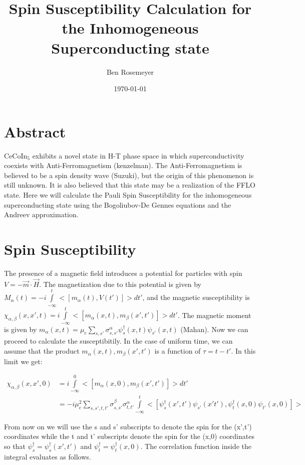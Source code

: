 \documentclass{article}
\begin{document}
\title{Spin Susceptibility Calculation for the Inhomogeneous Superconducting state}
\author{Ben Rosemeyer}
\date{\today}
\maketitle

\section*{Abstract}
CeCoIn$_5$ exhibits a novel state in H-T phase space in which superconductivity coexists with Anti-Ferromagnetism (kenzelman). The Anti-Ferromagnetism is believed to be a spin density wave (Suzuki), but the origin of this phenomenon is still unknown. It is also believed that this state may be a realization of the FFLO state. Here we will calculate the Pauli Spin Susceptibility for the inhomogeneous superconducting state using the Bogoliubov-De Gennes equations and the Andreev approximation.

\section*{Spin Susceptibility}
The presence of a magnetic field introduces a potential for particles with spin $V=-\vec{m}\cdot\vec{H}$. The magnetization due to this potential is given by $M_\alpha(t)=-i\int\limits_{-\infty}^t <[m_\alpha(t),V(t')]>dt'$, and the magnetic susceptibility is $\chi_{\alpha,\beta}(x,x',t)=i\int\limits_{-\infty}^t<[m_\alpha(x,t),m_\beta(x',t')]>dt'$. The magnetic moment is given by $m_\alpha(x,t)=\mu_e\sum\limits_{s,s'} \sigma^{\alpha}_{s,s'}\psi^\dagger_s(x,t) \psi_{s'}(x,t)$ (Mahan). Now we can proceed to calculate the susceptibitily. In the case of uniform time, we can assume that the product $m_\alpha(x,t),m_\beta(x',t')$ is a function of $\tau=t-t'$. In this limit we get:

\begin{align*}
\chi_{\alpha,\beta}(x,x',0)&=i\int\limits_{-\infty}^0<[m_\alpha(x,0),m_\beta(x',t')]>dt' \\ 
&=-i\mu_e^2\sum\limits_{s,s',t,t'}\sigma^{\beta}_{s,s'}\sigma^{\alpha}_{t,t'}\int\limits_{-\infty}^t<[\psi^\dagger_{s}(x',t') \psi_{s'}(x't'),\psi^\dagger_{t}(x,0) \psi_{t'}(x,0)]>
\end{align*}

From now on we will use the s and s' subscripts to denote the spin for the (x',t') coordinates while the t and t' subscripts denote the spin for the (x,0) coordinates so that $\psi^\dagger_{s}=\psi^\dagger_{s}(x',t')$ and $\psi^\dagger_{t}=\psi^\dagger_{t}(x,0)$. The correlation function inside the integral evaluates as follows.
\end{document}
